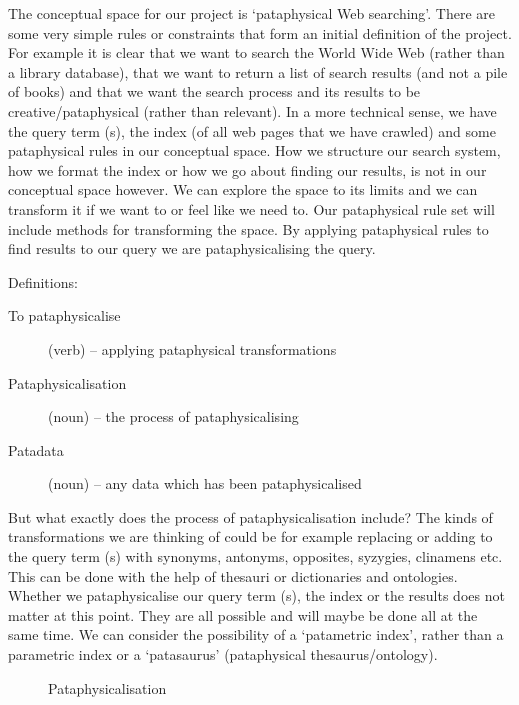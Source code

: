 The conceptual space for our project is `pataphysical Web searching'. There are some very simple rules or constraints that form an initial definition of the project. For example it is clear that we want to search the World Wide Web (rather than a library database), that we want to return a list of search results (and not a pile of books) and that we want the search process and its results to be creative/pataphysical (rather than relevant).  In a more technical sense, we have the query term (s), the index (of all web pages that we have crawled) and some pataphysical rules in our conceptual space. How we structure our search system, how we format the index or how we go about finding our results, is not in our conceptual space however. We can explore the space to its limits and we can transform it if we want to or feel like we need to. Our pataphysical rule set will include methods for transforming the space. By applying pataphysical rules to find results to our query we are pataphysicalising the query.

Definitions:
\begin{description}
  \item [To pataphysicalise] (verb) – applying pataphysical transformations
  \item [Pataphysicalisation] (noun) – the process of pataphysicalising
  \item [Patadata] (noun) – any data which has been pataphysicalised
\end{description}

But what exactly does the process of pataphysicalisation include? The kinds of transformations we are thinking of could be for example replacing or adding to the query term (s) with synonyms, antonyms, opposites, syzygies, clinamens etc. This can be done with the help of thesauri or dictionaries and ontologies. Whether we pataphysicalise our query term (s), the index or the results does not matter at this point. They are all possible and will maybe be done all at the same time. We can consider the possibility of a `patametric index', rather than a parametric index or a `patasaurus' (pataphysical thesaurus/ontology).

\begin{figure}[!htbp] %
  \centering
  \def\svgwidth{\columnwidth}
  
\caption[Pataphysicalisation]{Pataphysicalisation}
\label{fig:patasearch02f}
\end{figure}

